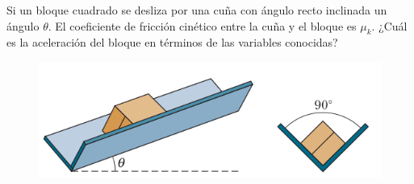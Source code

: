 \begin{ejercicio}
		Si un bloque cuadrado se desliza por una cuña con ángulo recto inclinada un ángulo $\theta$. El coeficiente de fricción cinético entre la cuña y el bloque es $\mu _k$. ¿Cuál es la aceleración del bloque en términos de las variables conocidas?
		\begin{figure}[H]
			\centering
			\includegraphics[scale=0.3]{./img/cuna.png}
		\end{figure}
	\end{ejercicio}



